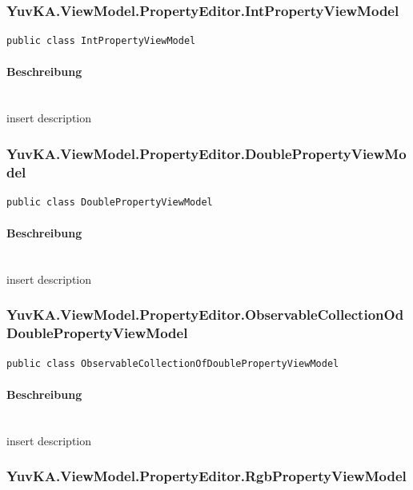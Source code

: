 \subsubsection{YuvKA.ViewModel.PropertyEditor.IntPropertyViewModel}

\begin{verbatim}
public class IntPropertyViewModel
\end{verbatim}

\paragraph{Beschreibung}~\\
insert description




\subsubsection{YuvKA.ViewModel.PropertyEditor.DoublePropertyViewModel}

\begin{verbatim}
public class DoublePropertyViewModel
\end{verbatim}

\paragraph{Beschreibung}~\\
insert description




\subsubsection{YuvKA.ViewModel.PropertyEditor.ObservableCollectionOdDoublePropertyViewModel}

\begin{verbatim}
public class ObservableCollectionOfDoublePropertyViewModel
\end{verbatim}

\paragraph{Beschreibung}~\\
insert description



\subsubsection{YuvKA.ViewModel.PropertyEditor.RgbPropertyViewModel}

